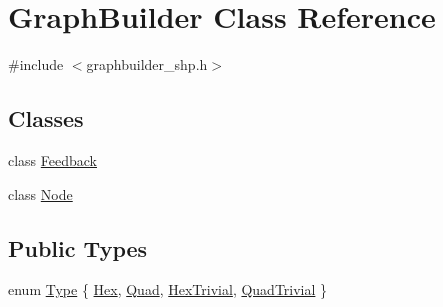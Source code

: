 \hypertarget{class_graph_builder}{}\section{Graph\+Builder Class Reference}
\label{class_graph_builder}


{\ttfamily \#include $<$graphbuilder\+\_\+shp.\+h$>$}

\subsection*{Classes}
\begin{DoxyCompactItemize}
\item 
class \mbox{\hyperlink{class_graph_builder_1_1_feedback}{Feedback}}
\item 
class \mbox{\hyperlink{class_graph_builder_1_1_node}{Node}}
\end{DoxyCompactItemize}
\subsection*{Public Types}
\begin{DoxyCompactItemize}
\item 
enum \mbox{\hyperlink{class_graph_builder_ad9125786780ea834b0368c7a599bb5d9}{Type}} \{ \mbox{\hyperlink{class_graph_builder_ad9125786780ea834b0368c7a599bb5d9a7960bca8fb514586d5333855af34456c}{Hex}}, 
\mbox{\hyperlink{class_graph_builder_ad9125786780ea834b0368c7a599bb5d9af7d3b22f8acb9a63d63019b1fd8cdeb3}{Quad}}, 
\mbox{\hyperlink{class_graph_builder_ad9125786780ea834b0368c7a599bb5d9a058d208e098ddc5f2303c7706fbd02d2}{Hex\+Trivial}}, 
\mbox{\hyperlink{class_graph_builder_ad9125786780ea834b0368c7a599bb5d9ade27312a13a0012bfda9e80451d0c195}{Quad\+Trivial}}
 \}
\end{DoxyCompactItemize}
